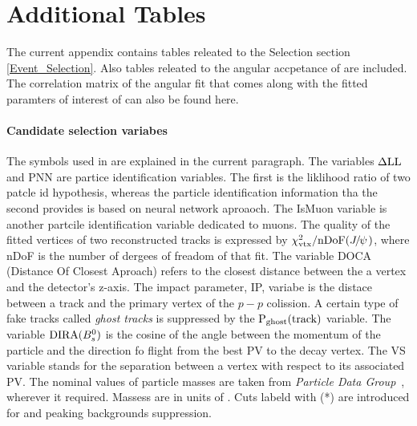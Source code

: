 
\chapter{Additional Tables}
\label{AdditionalTables}

The current appendix contains tables releated to the Selection section \ref{Event_Selection}.
Also tables releated to the angular accpetance of  are included.
The correlation matrix of the angular fit that comes along with the fitted paramters
of interest of  can also be found here.

\subsubsection{Candidate selection variabes}
The symbols used in  are explained in the current paragraph.
The variables ${\rm \Delta LL}$ and PNN are partice identification variables. The first is the
liklihood ratio of two patcle id hypothesis, whereas the particle identification information
tha the second provides is based on neural network aproaoch. The IsMuon variable is another
partcile identification variable dedicated to muons. The quality of the fitted vertices
of two reconstructed tracks is expressed by $\chi^2_{\rm vtx}/{\rm nDoF}({J\mskip -3mu/\mskip -2mu\psi\mskip 2mu})$, where nDoF
is the number of dergees of freadom of that fit. The variable DOCA (Distance Of Closest Aproach)
refers to the closest distance between the a vertex and the detector's z-axis. The impact parameter,
IP, variabe is the distace between a track and the primary vertex of the $p-p$ colission.
A certain type of fake tracks called {\it ghost tracks} is suppressed by the $\text{P}_{\rm ghost}(\rm track)$
variable. The variable ${\rm DIRA}(B^0_s)$ is the cosine of the angle between the momentum of the \Bs particle
and the direction fo flight from the best PV to the \Bs decay vertex. The VS variable stands for
the separation between a vertex with respect to its associated PV. The nominal values of particle
masses are taken from {\it Particle Data Group}~\cite{PDG}, wherever it required. Massess are in units of \mevcc. Cuts labeld with (*) are introduced
for \LbJpsipK and \LbJpsippi peaking backgrounds suppression.

